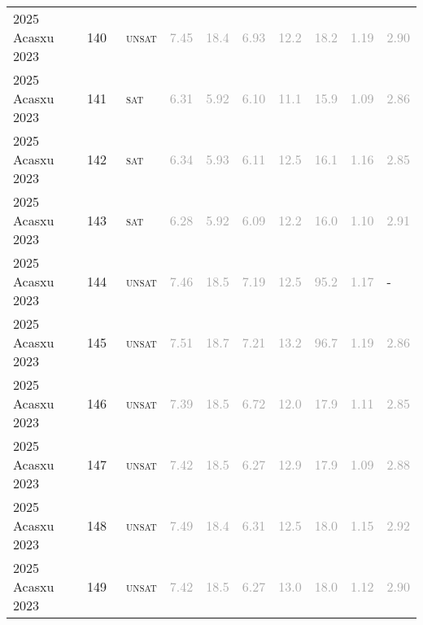 \begin{center}
{\begin{longtable}{@{}llllllllll@{}}
2025 Acasxu 2023 & 140 & ~\textsc{unsat} & \textcolor{darkgray}{7.45} & \textcolor{darkgray}{18.4} & \textcolor{darkgray}{6.93} & \textcolor{darkgray}{12.2} & \textcolor{darkgray}{18.2} & \textcolor{darkgray}{1.19} & \textcolor{darkgray}{2.90} \\
2025 Acasxu 2023 & 141 & ~\textsc{sat} & \textcolor{darkgray}{6.31} & \textcolor{darkgray}{5.92} & \textcolor{darkgray}{6.10} & \textcolor{darkgray}{11.1} & \textcolor{darkgray}{15.9} & \textcolor{darkgray}{1.09} & \textcolor{darkgray}{2.86} \\
2025 Acasxu 2023 & 142 & ~\textsc{sat} & \textcolor{darkgray}{6.34} & \textcolor{darkgray}{5.93} & \textcolor{darkgray}{6.11} & \textcolor{darkgray}{12.5} & \textcolor{darkgray}{16.1} & \textcolor{darkgray}{1.16} & \textcolor{darkgray}{2.85} \\
2025 Acasxu 2023 & 143 & ~\textsc{sat} & \textcolor{darkgray}{6.28} & \textcolor{darkgray}{5.92} & \textcolor{darkgray}{6.09} & \textcolor{darkgray}{12.2} & \textcolor{darkgray}{16.0} & \textcolor{darkgray}{1.10} & \textcolor{darkgray}{2.91} \\
2025 Acasxu 2023 & 144 & ~\textsc{unsat} & \textcolor{darkgray}{7.46} & \textcolor{darkgray}{18.5} & \textcolor{darkgray}{7.19} & \textcolor{darkgray}{12.5} & \textcolor{darkgray}{95.2} & \textcolor{darkgray}{1.17} & - \\
2025 Acasxu 2023 & 145 & ~\textsc{unsat} & \textcolor{darkgray}{7.51} & \textcolor{darkgray}{18.7} & \textcolor{darkgray}{7.21} & \textcolor{darkgray}{13.2} & \textcolor{darkgray}{96.7} & \textcolor{darkgray}{1.19} & \textcolor{darkgray}{2.86} \\
2025 Acasxu 2023 & 146 & ~\textsc{unsat} & \textcolor{darkgray}{7.39} & \textcolor{darkgray}{18.5} & \textcolor{darkgray}{6.72} & \textcolor{darkgray}{12.0} & \textcolor{darkgray}{17.9} & \textcolor{darkgray}{1.11} & \textcolor{darkgray}{2.85} \\
2025 Acasxu 2023 & 147 & ~\textsc{unsat} & \textcolor{darkgray}{7.42} & \textcolor{darkgray}{18.5} & \textcolor{darkgray}{6.27} & \textcolor{darkgray}{12.9} & \textcolor{darkgray}{17.9} & \textcolor{darkgray}{1.09} & \textcolor{darkgray}{2.88} \\
2025 Acasxu 2023 & 148 & ~\textsc{unsat} & \textcolor{darkgray}{7.49} & \textcolor{darkgray}{18.4} & \textcolor{darkgray}{6.31} & \textcolor{darkgray}{12.5} & \textcolor{darkgray}{18.0} & \textcolor{darkgray}{1.15} & \textcolor{darkgray}{2.92} \\
2025 Acasxu 2023 & 149 & ~\textsc{unsat} & \textcolor{darkgray}{7.42} & \textcolor{darkgray}{18.5} & \textcolor{darkgray}{6.27} & \textcolor{darkgray}{13.0} & \textcolor{darkgray}{18.0} & \textcolor{darkgray}{1.12} & \textcolor{darkgray}{2.90} \\

\end{longtable}}
\end{center}
